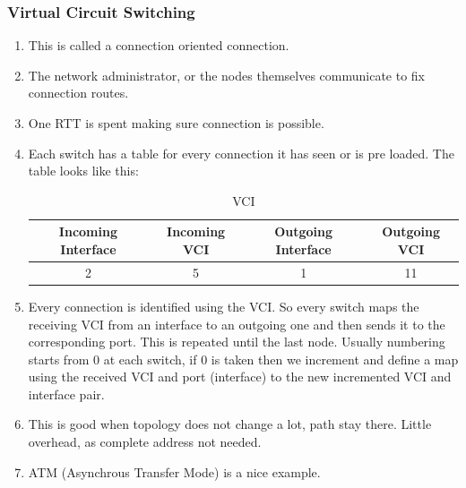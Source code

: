 \documentclass[11pt, a4paper]{article}
\begin{document}
\subsubsection{Virtual Circuit Switching}
\begin{enumerate}
    \item This is called a connection oriented connection.
    \item  The network administrator, or the nodes themselves communicate to fix connection routes.
    \item One RTT is spent making sure connection is possible.
    \item Each switch has a table for every connection it has seen or is pre loaded. The table looks like this:
    \begin{table}[H]
        \centering
        \begin{tabular}{ | c | c | c | c |}
        \hline
        Incoming Interface & Incoming VCI & Outgoing Interface & Outgoing VCI \\
        \hline
        2 & 5 & 1 & 11 \\
        \hline
        \end{tabular}
        \caption{VCI}
        \label{tab:VCI Table}
    \end{table}
    \item Every connection is identified using the VCI. So every switch maps the receiving VCI from an interface to an outgoing one and then sends it to the corresponding port. This is repeated until the last node. Usually numbering starts from 0 at each switch, if 0 is taken then we increment and define a map using the received VCI and port (interface) to the new incremented VCI and interface pair.
    \item This is good when topology does not change a lot, path stay there. Little overhead, as complete address not needed.
    \item ATM (Asynchrous Transfer Mode) is a nice example.
\end{enumerate}
\end{document}
